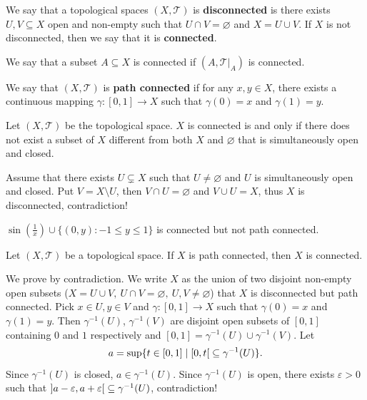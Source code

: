 \begin{definitionenv}
    We say that a topological spaces $(X,\mathscr{T})$ is \textbf{disconnected} is there exists $U,V \subseteq X$ open and non-empty such that $U \cap V = \varnothing$ and $X = U \cup V$.
    If $X$ is not disconnected, then we say that it is \textbf{connected}.

    \quad We say that a subset $A \subseteq X$ is connected if $(A,\mathscr{T}|_A)$ is connected.
    
    \quad We say that $(X,\mathscr{T})$ is \textbf{path connected} if for any $x,y\in X$, there exists a continuous mapping $\gamma : [0,1]\rightarrow X$ such that $\gamma(0) = x$ and $\gamma(1) = y$.
\end{definitionenv}
\begin{propositionenv}\label{thm:connectedSpace_iff_clopen}
    Let $(X,\mathscr{T})$ be the topological space.
    $X$ is connected is and only if there does not exist a subset of $X$ different from both $X$ and $\varnothing$ that is simultaneously open and closed.
\end{propositionenv}
\begin{proofenv}
    Assume that there exists $U \subsetneq X$ such that $U \neq \varnothing$ and $U$ is simultaneously open and closed.
    Put $V = X\setminus U$, then $V \cap U = \varnothing$ and $V\cup U =X$, thus $X$ is disconnected, contradiction!
\end{proofenv}

\begin{exampleenv}
    $\sin\left(\frac{1}{x}\right) \cup \{(0,y): -1\le y\le 1\}$
 is connected but not path connected.
\end{exampleenv}

\begin{propositionenv}\label{thm:IsPathConnected.isConnected}
    Let $(X,\mathscr{T})$ be a topological space.
    If $X$ is path connected, then $X$ is connected.
\end{propositionenv}
\begin{proofenv}
    We prove by contradiction.
    We write $X$ as the union of two disjoint non-empty open subsets ($X = U\cup V,\ U\cap V =\varnothing,\ U,V \neq \varnothing$) that $X$ is disconnected but path connected.
    Pick $x\in U, y \in V$ and $\gamma:[0,1]\rightarrow X$ such that $\gamma(0) = x$ and $\gamma(1) = y$.
    Then $\gamma^{-1}(U)$, $\gamma^{-1}(V)$ are disjoint open subsets of $[0,1]$ containing $0$ and $1$ respectively and $[0,1] = \gamma^{-1}(U)\cup \gamma^{-1}(V)$.
    Let
    $$ a = \sup \{t \in [0,1] \mid \interval[open right]{0}{t} \subseteq \gamma^{-1}(U)\}.$$
    Since $\gamma^{-1}(U)$ is closed, $a \in \gamma^{-1}(U)$.
    Since $\gamma^{-1}(U)$ is open, there exists $\varepsilon > 0$ such that $\interval[open]{a-\varepsilon}{a+\varepsilon} \subseteq \gamma^{-1}(U)$, contradiction!
\end{proofenv}

